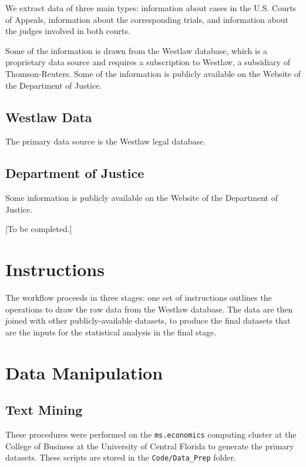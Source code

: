\documentclass[11pt]{paper}
\begin{document}
We extract data of three main types: 
information about cases in the U.S. Courts of Appeals, 
information about the corresponding trials, 
and information about the judges involved in both courts. 

Some of the information is drawn from the Westlaw database, which is a proprietary data source
and requires a subscription to Westlaw, a subsidiary of Thomson-Reuters. 
Some of the information is publicly available on the Website of the Department of Justice. 

\subsection*{Westlaw Data}

The primary data source is the Westlaw legal database. 




\subsection*{Department of Justice}

Some information is publicly available on the Website of the Department of Justice. 

[To be completed.]





\section*{Instructions}

The workflow proceeds in three stages: 
one set of instructions outlines the operations to draw the raw data from the 
Westlaw database. 
The data are then joined with other publicly-available datasets, 
to produce the final datasets that are the inputs for the statistical analysis
in the final stage. 


\section*{Data Manipulation}



\subsection{Text Mining}

These procedures were performed 
on the \texttt{ms.economics} computing cluster
at the College of Business
at the University of Central Florida
to generate the primary datasets. 
These scripts are stored in the \texttt{Code/Data\_Prep} folder. 
\end{document}

